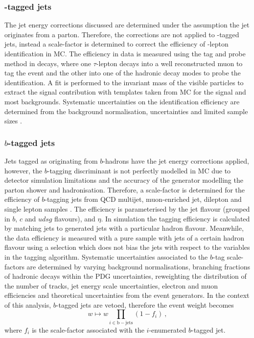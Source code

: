 \subsubsection{\Ptauh-tagged jets}

The jet energy corrections discussed are determined under the assumption the
jet originates from a parton. Therefore, the corrections are not applied to
\Ptauh-tagged jets, instead a scale-factor is determined to correct the
efficiency of \Ptauh-lepton identification in MC. The efficiency in data is
measured using the tag and probe method in \IDYtt decays, where one
$\tau$-lepton decays into a well reconstructed muon to tag the event and the
other into one of the hadronic decay modes to probe the identification. A fit
is performed to the invariant mass of the visible particles to extract the
signal contribution with templates taken from MC for the signal and most
backgrounds. Systematic uncertainties on the identification efficiency are
determined from the background normalisation, \ptmiss uncertainties and
limited sample sizes \cite{Sirunyan:2018pgf}.


\subsubsection{$b$-tagged jets}

Jets tagged as originating from $b$-hadrons have the jet energy corrections
applied, however, the $b$-tagging discriminant is not perfectly modelled in MC
due to detector simulation limitations and the accuracy of the generator
modelling the parton shower and hadronisation. Therefore, a scale-factor is
determined for the efficiency of $b$-tagging jets from QCD multijet,
muon-enriched jet, dilepton \Itt and single lepton \Itt samples
\cite{Sirunyan:2017ezt}. The efficiency is parameterised by the jet flavour
(grouped in $b$, $c$ and $udsg$ flavours), \pt and $\eta$. In simulation the
tagging efficiency is calculated by matching jets to generated jets with a
particular hadron flavour. Meanwhile, the data efficiency is measured with a
pure sample with jets of a certain hadron flavour using a selection which does
not bias the jets with respect to the variables in the tagging algorithm.
Systematic uncertainties associated to the $b$-tag scale-factors are
determined by varying background normalisations, branching fractions of
hadronic decays within the PDG uncertainties, reweighting the distribution of
the number of tracks, jet energy scale uncertainties, electron and muon
efficiencies and theoretical uncertainties from the event generators. In the
context of this analysis, $b$-tagged jets are vetoed, therefore the event
weight becomes
%
\begin{equation}
    w \mapsto w \prod_{i\in\mathrm{b-jets}} (1 - f_i)\ ,
\end{equation}
%
where $f_i$ is the scale-factor associated with the $i$-enumerated $b$-tagged
jet.


